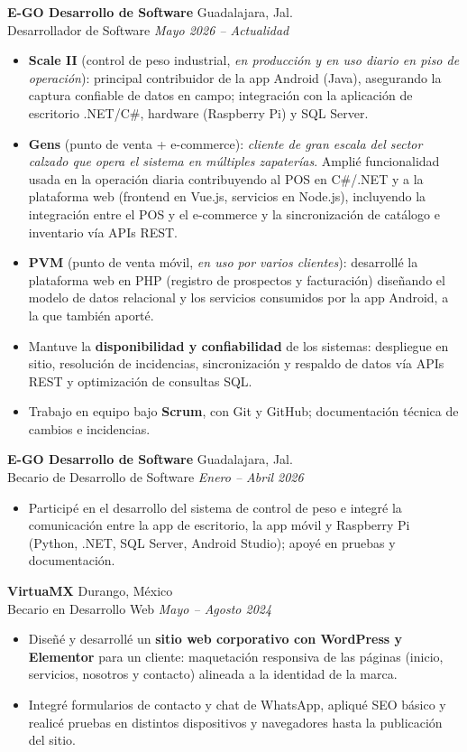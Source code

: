 \documentclass[11pt,a4paper]{article}
\newcommand{\entry}[4]{%
  \textbf{#1} \hfill {\color{muted}#2}\\[1pt]
  {\color{accent}#3} \hfill {\color{muted}\itshape #4}\\[3pt]
}
\begin{document}
\entry{E-GO Desarrollo de Software}{Guadalajara, Jal.}{Desarrollador de Software}{Mayo 2026 -- Actualidad}
\begin{itemize}
  \item \textbf{Scale II} (control de peso industrial, \textit{en producción y en uso diario en piso de operación}):
        principal contribuidor de la app Android (Java), asegurando la captura confiable de datos en campo; integración
        con la aplicación de escritorio .NET/C\#, hardware (Raspberry Pi) y SQL Server.
  \item \textbf{Gens} (punto de venta + e-commerce): \textit{cliente de gran escala del sector calzado que opera el
        sistema en múltiples zapaterías}. Amplié funcionalidad usada en la operación diaria contribuyendo al POS en
        C\#/.NET y a la plataforma web (frontend en Vue.js, servicios en Node.js), incluyendo la integración entre el
        POS y el e-commerce y la sincronización de catálogo e inventario vía APIs REST.
  \item \textbf{PVM} (punto de venta móvil, \textit{en uso por varios clientes}): desarrollé la plataforma web en PHP
        (registro de prospectos y facturación) diseñando el modelo de datos relacional y los servicios consumidos por
        la app Android, a la que también aporté.
  \item Mantuve la \textbf{disponibilidad y confiabilidad} de los sistemas: despliegue en sitio, resolución de
        incidencias, sincronización y respaldo de datos vía APIs REST y optimización de consultas SQL.
  \item Trabajo en equipo bajo \textbf{Scrum}, con Git y GitHub; documentación técnica de cambios e incidencias.
\end{itemize}

\entry{E-GO Desarrollo de Software}{Guadalajara, Jal.}{Becario de Desarrollo de Software}{Enero -- Abril 2026}
\begin{itemize}
  \item Participé en el desarrollo del sistema de control de peso e integré la comunicación entre la app de escritorio,
        la app móvil y Raspberry Pi (Python, .NET, SQL Server, Android Studio); apoyé en pruebas y documentación.
\end{itemize}

\entry{VirtuaMX}{Durango, México}{Becario en Desarrollo Web}{Mayo -- Agosto 2024}
\begin{itemize}
  \item Diseñé y desarrollé un \textbf{sitio web corporativo con WordPress y Elementor} para un cliente: maquetación responsiva de las páginas (inicio, servicios, nosotros y contacto) alineada a la identidad de la marca.
  \item Integré formularios de contacto y chat de WhatsApp, apliqué SEO básico y realicé pruebas en distintos dispositivos y navegadores hasta la publicación del sitio.
\end{itemize}
\end{document}
